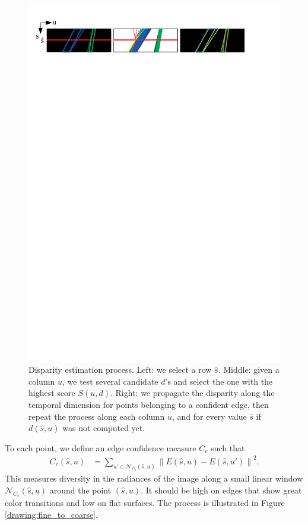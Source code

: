 \documentclass{article}
\newcommand{\norm}[1]{\left\lVert#1\right\rVert}
\theoremstyle{definition}
\begin{document}
\begin{figure}[ht]
\centering
 \includegraphics[width=1.0\textwidth, trim=0.5cm 25.5cm 2.5cm 1cm, clip]{drawings/depth_estimation.pdf}
 \caption{Disparity estimation process. Left: we select a row $\widehat{s}$. Middle: given a column $u$, we test several candidate $d$'s and select the one with the highest score $S(u, d)$. Right: we propagate the disparity along the temporal dimension for points belonging to  a confident edge, then repeat the process along each column $u$, and for every value $\widehat{s}$ if $d(\widehat{s}, u)$ was not computed yet.}
 \label{drawing:depth_estimation}
\end{figure}



To each point, we define an edge confidence measure $C_e$ such that
\begin{align}
 C_e (\widehat{s}, u) &= \sum_{u' \in \mathcal{N}_{C_e}(\widehat{s}, u)} \norm{E(\widehat{s}, u) - E(\widehat{s}, u')}^2. 
\end{align}
This measures diversity in the radiances of the image along a small linear window $\mathcal{N}_{C_e}(\widehat{s}, u)$ around the point $(\widehat{s}, u)$. It should be high on edges that show great color transitions and low on flat surfaces. The process is illustrated in Figure \ref{drawing:fine_to_coarse}.
\end{document}
